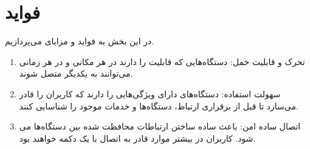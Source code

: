 \section{فواید}
در این بخش به فواید و مزایای 
می‌پردازیم.
\begin{enumerate}
	\item تحرک و قابلیت حمل: دستگاه‌هایی که قابلیت 
	را دارند در هر مکانی و در هر زمانی می‌توانند به یکدیگر متصل شوند.
	\item سهولت استفاده: دستگاه‌های دارای 
 ویژگی‌هایی را دارند که کاربران را قادر می‌سازد تا قبل از برقراری ارتباط، دستگاه‌ها و خدمات موجود را شناسایی کنند.
     \item اتصال ساده امن: 
      باعث ساده ساختن ارتباطات محافظت شده بین دستگاه‌ها می شود. کاربران در بیشتر موارد قادر به اتصال با یک دکمه خواهند بود.
     \cite{WiFiAlliance}
\end{enumerate}